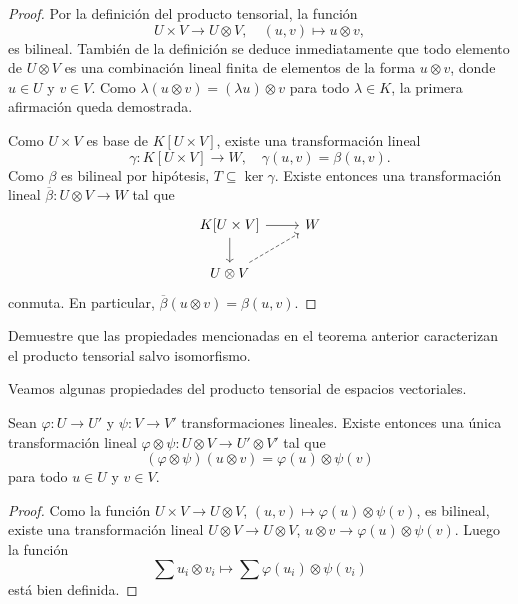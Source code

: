 \begin{proof}
	Por la definición del producto tensorial, la función 
	\[
	U\times V\to U\otimes V,\quad
	(u,v)\mapsto u\otimes v,
	\]
	es bilineal. También de la definición se deduce inmediatamente que todo
	elemento de $U\otimes V$ es una combinación lineal finita de elementos de
	la forma $u\otimes v$, donde $u\in U$ y $v\in V$. Como $\lambda(u\otimes
	v)=(\lambda u)\otimes v$ para todo $\lambda\in K$, la primera afirmación
	queda demostrada.

	Como $U\times V$ es base de $K[U\times V]$, existe una transformación lineal 
	\[
		\gamma\colon K[U\times V]\to W,\quad
	\gamma(u,v)=\beta(u,v). 
	\]
	Como $\beta$ es bilineal por hipótesis, $T\subseteq\ker\gamma$. Existe
	entonces una transformación lineal $\overline{\beta}\colon U\otimes V\to
	W$ tal que 
	\[
	\begin{tikzcd}
		K[U\times V] \arrow[r]\arrow[d] & W \\
		U\otimes V\arrow[ur, dashrightarrow]
	\end{tikzcd}
	\]
	conmuta. En particular, $\overline{\beta}(u\otimes v)=\beta(u,v)$. 
\end{proof}

\begin{exercise}
	\label{xca:tensorial_unicidad}
	Demuestre que las propiedades mencionadas en el teorema anterior
	caracterizan el producto tensorial salvo isomorfismo.
\end{exercise}

Veamos algunas propiedades del producto tensorial de espacios vectoriales. 

\begin{lemma}
	Sean $\varphi\colon U\to U'$ y $\psi\colon V\to V'$ transformaciones
	lineales. Existe entonces una única transformación lineal
	$\varphi\otimes\psi\colon U\otimes V\to U'\otimes V'$ tal que
	\[
		(\varphi\otimes\psi)(u\otimes v)=\varphi(u)\otimes\psi(v)
	\]
	para todo $u\in U$ y $v\in V$.
\end{lemma}

\begin{proof}
	Como la función $U\times V\to U\otimes V$,
	$(u,v)\mapsto\varphi(u)\otimes\psi(v)$, es bilineal, existe una
	transformación lineal $U\otimes V\to U\otimes V$, $u\otimes
	v\to\varphi(u)\otimes\psi(v)$. Luego la función
	\[
		\sum u_i\otimes v_i\mapsto\sum\varphi(u_i)\otimes\psi(v_i)
	\]
	está bien definida. 
\end{proof}

